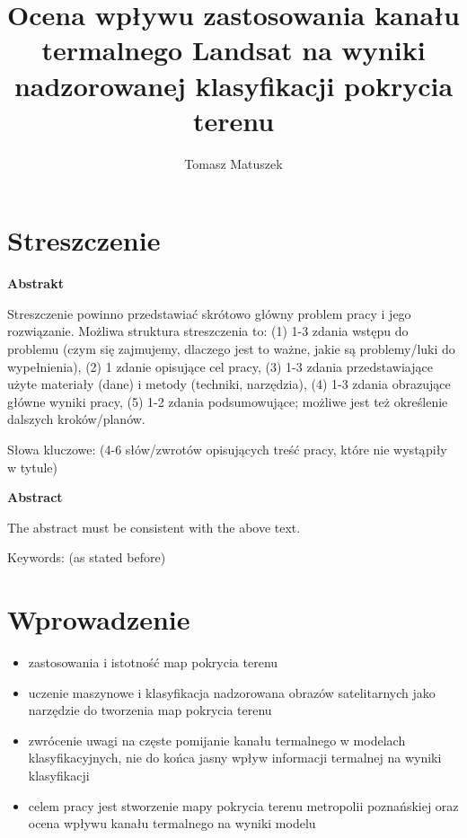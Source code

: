 \documentclass{amuthesis}
\author{Tomasz Matuszek}
\title{Ocena wpływu zastosowania kanału termalnego Landsat na wyniki
nadzorowanej klasyfikacji pokrycia terenu}
\begin{document}

\titlepage


\hypertarget{streszczenie}{%
\chapter*{Streszczenie}\label{streszczenie}}

\textbf{Abstrakt}

Streszczenie powinno przedstawiać skrótowo główny problem pracy i jego
rozwiązanie. Możliwa struktura streszczenia to: (1) 1-3 zdania wstępu do
problemu (czym się zajmujemy, dlaczego jest to ważne, jakie są
problemy/luki do wypełnienia), (2) 1 zdanie opisujące cel pracy, (3) 1-3
zdania przedstawiające użyte materiały (dane) i metody (techniki,
narzędzia), (4) 1-3 zdania obrazujące główne wyniki pracy, (5) 1-2
zdania podsumowujące; możliwe jest też określenie dalszych
kroków/planów.

Słowa kluczowe: (4-6 słów/zwrotów opisujących treść pracy, które nie
wystąpiły w tytule)

\textbf{Abstract}

The abstract must be consistent with the above text.

Keywords: (as stated before)

\newpage

\sf\tighttoc\doublespacing


\hypertarget{sec-wprowadzenie}{%
\chapter{Wprowadzenie}\label{sec-wprowadzenie}}

\begin{itemize}
\item
  zastosowania i istotność map pokrycia terenu
\item
  uczenie maszynowe i klasyfikacja nadzorowana obrazów satelitarnych
  jako narzędzie do tworzenia map pokrycia terenu
\item
  zwrócenie uwagi na częste pomijanie kanału termalnego w modelach
  klasyfikacyjnych, nie do końca jasny wpływ informacji termalnej na
  wyniki klasyfikacji
\item
  celem pracy jest stworzenie mapy pokrycia terenu metropolii
  poznańskiej oraz ocena wpływu kanału termalnego na wyniki modelu
\end{itemize}
\end{document}
